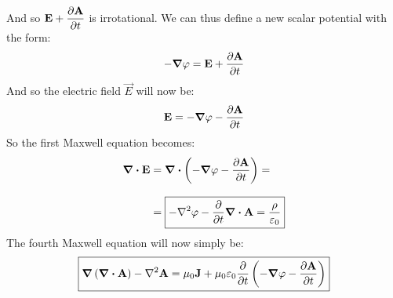 And so $\vec{E} + \pdv{\vec{A}}{t}$ is irrotational. We can thus define a new scalar potential with the form:
\begin{equation}
  -\grad{\potE} = \vec{E} + \pdv{\vec{A}}{t}
\end{equation}
And so the electric field $\vec{E}$ will now be:
\begin{equation}
  \vec{E} =  -\grad{\potE} -\pdv{\vec{A}}{t}
\end{equation}
So the first Maxwell equation becomes:
\begin{equation}
  \begin{split}
    \div{\vec{E}} &= \div{\brackets{-\grad{\potE} -\pdv{\vec{A}}{t}}} = \\[8pt]
    &= \boxed{-\lap{\potE} -\pdv{}{t}\div{\vec{A}} = \dfrac{\rho}{\epsz}}
  \end{split}
\end{equation}
The fourth Maxwell equation will now simply be:
\begin{equation}
  \boxed{\grad{\brackets{\div{\vec{A}}}} - \lap{\vec{A}} = \muz \vec{J} + \muz \epsz \pdv{}{t}\brackets{-\grad{\potE} - \pdv{\vec{A}}{t}}}
\end{equation}
